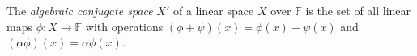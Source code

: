 The \emph{algebraic conjugate space} $X'$ of a linear space $X$ over $\mathbb{F}$ is the set of all linear maps $\phi: X \to \mathbb{F}$ with operations $(\phi+\psi)(x)=\phi(x)+\psi(x)$ and $(\alpha\phi)(x)=\alpha\phi(x)$.
